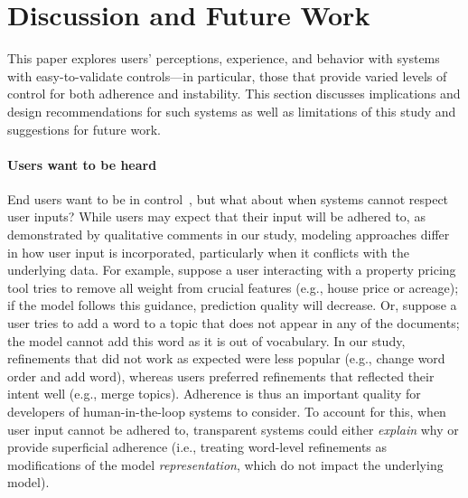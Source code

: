 \section{Discussion and Future Work}
\label{discussion}

This paper explores users' perceptions, experience, and behavior with systems with easy-to-validate controls---in particular, those that provide varied levels of control for both adherence and instability.  This section discusses implications and design recommendations for such systems as well as limitations of this study and suggestions for future work.

\paragraph{Users want to be heard}
End users want to be in control~\cite{Vaccaro2018TheSettings, Kocielnik2019WillSystems}, but what about when systems cannot respect user inputs? While users may expect that their input will be adhered to, as demonstrated by qualitative comments in our study, modeling approaches differ in how user input is incorporated, particularly when it conflicts with the underlying data. For example, suppose a user interacting with a property pricing tool tries to remove all weight from crucial features (e.g., house price or acreage); if the model follows this guidance, prediction quality will decrease. Or, suppose a user tries to add a word to a topic that does not appear in any of the documents; the model cannot add this word as it is out of vocabulary. 
In our study, refinements that did not work as expected were less popular (e.g., change word order and add word), whereas users preferred refinements that reflected their intent well (e.g., merge topics). Adherence is thus an important quality for developers of human-in-the-loop systems to consider. To account for this, when user input cannot be adhered to, transparent systems could either \textit{explain} why or provide superficial adherence (i.e., treating word-level refinements as modifications of the model \textit{representation}, which do not impact the underlying model).

